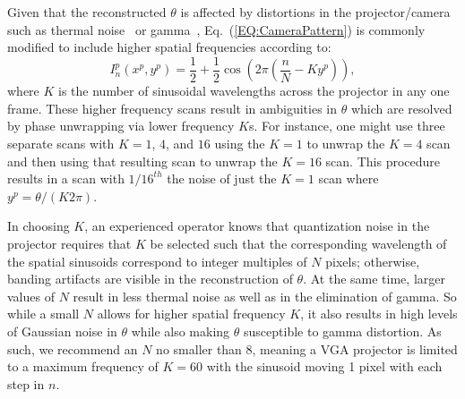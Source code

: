 \documentclass[10pt]{article}
\begin{document}
Given that the reconstructed $\theta$ is affected by distortions in the projector/camera such as thermal noise~\cite{Daley:98} or gamma~\cite{Liu:10}, Eq.~(\ref{EQ:CameraPattern}) is commonly modified to include higher spatial frequencies according to:
\begin{equation}
    I^p_n(x^p, y^p) = \frac{1}{2} + \frac{1}{2} \cos \left( 2\pi (\frac{n}{N} - K y^p)\right),
\end{equation}
where $K$ is the number of sinusoidal wavelengths across the projector in any one frame.  These higher frequency scans result in ambiguities in $\theta$ which are resolved by phase unwrapping via lower frequency $K$s.  For instance, one might use three separate scans with $K=1$, $4$, and $16$ using the $K=1$ to unwrap the $K=4$ scan and then using that resulting scan to unwrap the $K=16$ scan.  This procedure results in a scan with ${1/16}^{th}$ the noise of just the $K=1$ scan where $y^p = \theta/(K 2\pi)$.

In choosing $K$, an experienced operator knows that quantization noise in the projector requires that $K$ be selected such that the corresponding wavelength of the spatial sinusoids correspond to integer multiples of $N$ pixels; otherwise, banding artifacts are visible in the reconstruction of $\theta$.  At the same time, larger values of $N$ result in less thermal noise as well as in the elimination of gamma.  So while a small $N$ allows for higher spatial frequency $K$, it also results in high levels of Gaussian noise in $\theta$ while also making $\theta$ susceptible to gamma distortion.  As such, we recommend an $N$ no smaller than 8, meaning a VGA projector is limited to a maximum frequency of $K=60$ with the sinusoid moving 1 pixel with each step in $n$.
\end{document}
